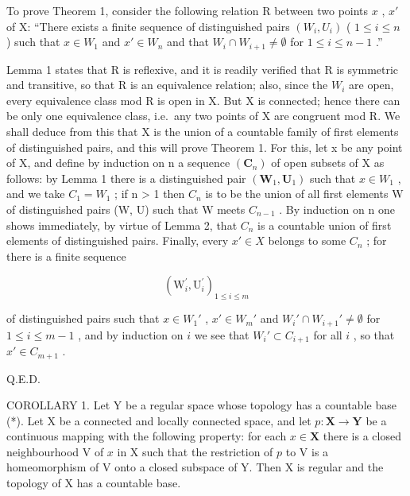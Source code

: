To prove Theorem 1, consider the following relation R between two points \(x\) , \(x'\) of X: ``There exists a finite sequence of distinguished pairs \((W_i, U_i)\) ( \(1 \leqslant i \leqslant n\) ) such that \(x \in W_1\) and \(x' \in W_n\) and that \(W_i \cap W_{i+1} \neq \emptyset\) for \(1 \leqslant i \leqslant n - 1\) .''

Lemma 1 states that R is reflexive, and it is readily verified that R is symmetric and transitive, so that R is an equivalence relation; also, since the \(W_{i}\) are open, every equivalence class mod R is open in X. But X is connected; hence there can be only one equivalence class, i.e.~any two points of X are congruent mod R. We shall deduce from this that X is the union of a countable family of first elements of distinguished pairs, and this will prove Theorem 1. For this, let x be any point of X, and define by induction on n a sequence \((\mathbf{C}_{n})\) of open subsets of X as follows: by Lemma 1 there is a distinguished pair \((\mathbf{W}_{1}, \mathbf{U}_{1})\) such that \(x \in W_{1}\) , and we take \(C_{1} = W_{1}\) ; if n \textgreater{} 1 then \(C_{n}\) is to be the union of all first elements W of distinguished pairs (W, U) such that W meets \(C_{n-1}\) . By induction on n one shows immediately, by virtue of Lemma 2, that \(C_{n}\) is a countable union of first elements of distinguished pairs. Finally, every \(x' \in X\) belongs to some \(C_{n}\) ; for there is a finite sequence

\[
\left(\mathrm{W} _ {i} ^ {\prime}, \mathrm{U} _ {i} ^ {\prime}\right) _ {1 \leqslant i \leqslant m}
\]

of distinguished pairs such that \(x \in W_1'\) , \(x' \in W_m'\) and \(W_i' \cap W_{i+1}' \neq \emptyset\) for \(1 \leqslant i \leqslant m - 1\) , and by induction on \(i\) we see that \(W_i' \subset C_{i+1}\) for all \(i\) , so that \(x' \in C_{m+1}\) .

Q.E.D.

COROLLARY 1. Let Y be a regular space whose topology has a countable base (*). Let X be a connected and locally connected space, and let \(p: \mathbf{X} \to \mathbf{Y}\) be a continuous mapping with the following property: for each \(x \in \mathbf{X}\) there is a closed neighbourhood V of \(x\) in X such that the restriction of \(p\) to V is a homeomorphism of V onto a closed subspace of Y. Then X is regular and the topology of X has a countable base.

